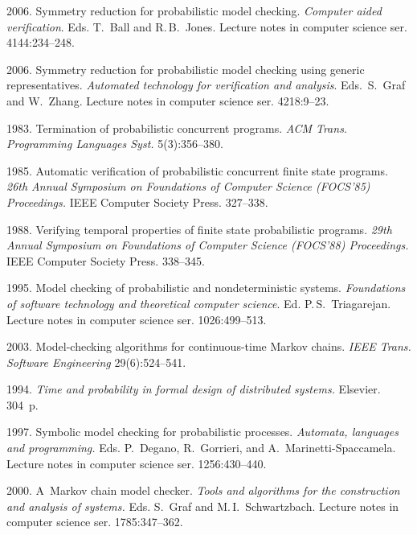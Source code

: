 \begin{multicols}{2}
{{\begin{thebibliography}{99}
2006.
Symmetry reduction for probabilistic model checking.
\textit{Computer aided verification}. Eds. T.~Ball and R.\,B.~Jones.
Lecture notes in computer science ser.
4144:234--248.

2006. Symmetry reduction for
probabilistic model checking using
generic representatives.
\textit{Automated technology for verification
and analysis}.
Eds.\ S.~Graf and W.~Zhang. Lecture notes in computer science ser.
4218:9--23.



1983. Termination of probabilistic concurrent programs.
\textit{ACM Trans. Programming Languages Syst.}
5(3):356--380.

 1985.
Automatic verification of probabilistic concurrent
finite state programs.
\textit{26th Annual Symposium on Foundations of Computer Science (FOCS'85) Proceedings.}
IEEE Computer Society Press. 327--338.

1988. Verifying temporal properties
of finite state probabilistic programs.
\textit{29th Annual Symposium on Foundations of Computer Science (FOCS'88)
Proceedings.}
IEEE Computer Society Press. 338--345.

1995. Model checking of probabilistic and
nondeterministic systems.
\textit{Foundations of software technology and theoretical computer science}.
Ed. P.\,S.~Triagarejan. Lecture notes in computer science ser.
1026:499--513.

2003.
Model-checking algorithms for continuous-time Markov chains.
\textit{IEEE Trans. Software Engineering} 29(6):524--541.

 1994.
\textit{Time and probability in formal design of distributed
systems.} Elsevier. 304~p.

1997. Symbolic model checking for probabilistic processes.
\textit{Automata,
languages and programming.}
Eds. P.~Degano,  R.~Gorrieri, and A.~Marinetti-Spaccamela.
Lecture notes in computer science ser.
1256:430--440.

2000. A~Markov chain model checker.
\textit{Tools and algorithms for the construction and analysis
of systems.} Eds. S.~Graf and M.\,I.~Schwartzbach.
Lecture notes in computer science ser.
1785:347--362.


\end{thebibliography}}}
\end{multicols}

